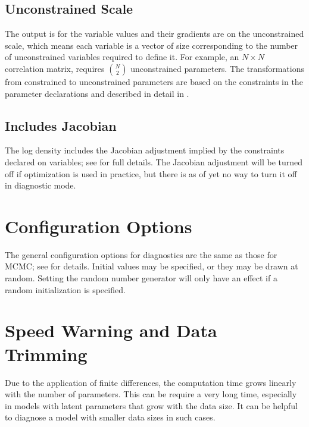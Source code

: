 \subsection{Unconstrained Scale}

The output is for the variable values and their gradients are on the
unconstrained scale, which means each variable is a vector of size
corresponding to the number of unconstrained variables required to
define it. For example, an $N \times N$ correlation matrix, requires
${N \choose 2}$ unconstrained parameters. The
transformations from constrained to unconstrained parameters are based
on the constraints in the parameter declarations and described in
detail in .

\subsection{Includes Jacobian}

The log density includes the Jacobian adjustment implied by the
constraints declared on variables; see
 for full details. The Jacobian
adjustment will be turned off if optimization is used in practice, but
there is as of yet no way to turn it off in diagnostic mode.

\section{Configuration Options}

The general configuration options for diagnostics are the same as
those for MCMC; see  for details. Initial
values may be specified, or they may be drawn at random. Setting the
random number generator will only have an effect if a random
initialization is specified.

\section{Speed Warning and Data Trimming}

Due to the application of finite differences, the computation time
grows linearly with the number of parameters. This can be require a
very long time, especially in models with latent parameters that grow
with the data size. It can be helpful to diagnose a model with smaller
data sizes in such cases.


